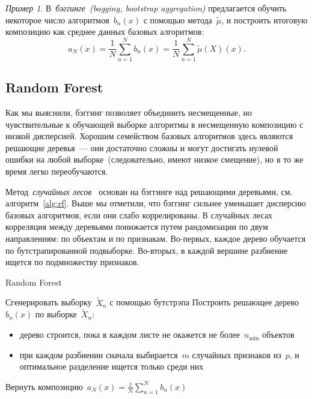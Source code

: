 \documentclass[a4paper, 12pt]{article}
\theoremstyle{plain} %
\theoremstyle{definition} %
\theoremstyle{remark} %
\newtheorem{example}{Пример}
\begin{document}
\begin{example}
В~\emph{бэггинге~(bagging, bootstrap aggregation)} предлагается обучить некоторое
число алгоритмов~$b_n(x)$ с помощью метода~$\tilde \mu$, и построить итоговую композицию
как среднее данных базовых алгоритмов:
\[
    a_N(x)
    =
    \frac{1}{N}
    \sum_{n = 1}^{N}
        b_n(x)
    =
    \frac{1}{N}
    \sum_{n = 1}^{N}
        \tilde \mu(X)(x).
\]

\subsection{Random Forest}

Как мы выяснили, бэггинг позволяет объединить несмещенные,
но чувствительные к обучающей выборке алгоритмы в несмещенную
композицию с низкой дисперсией.
Хорошим семейством базовых алгоритмов здесь являются решающие деревья~---
они достаточно сложны и могут достигать нулевой ошибки
на любой выборке~(следовательно, имеют низкое смещение),
но в то же время легко переобучаются.

Метод~\emph{случайных лесов}~\cite{breiman01randomforest} основан на бэггинге над решающими деревьями,
см. алгоритм~\ref{alg:rf}.
Выше мы отметили, что бэггинг сильнее уменьшает дисперсию
базовых алгоритмов, если они слабо коррелированы.
В случайных лесах корреляция между деревьями понижается путем рандомизации
по двум направлениям: по объектам и по признакам.
Во-первых, каждое дерево обучается по бутстрапированной подвыборке.
Во-вторых, в каждой вершине разбиение ищется по подмножеству признаков.

\begin{centering}
	\begin{algorithm}[t]
	\caption{Random Forest}
	\label{alg:rf}
	    \begin{algorithmic}[1]
	            \STATE Сгенерировать выборку~$\tilde X_n$ с помощью бутстрэпа
	            \STATE Построить решающее дерево~$b_n(x)$ по выборке~$\tilde X_n$:
	                \begin{itemize}
	                    \item дерево строится, пока в каждом листе не окажется не более~$n_{\min}$ объектов
	                    \item при каждом разбиении сначала выбирается~$m$ случайных
	                        признаков из~$p$, и оптимальное разделение ищется только среди них
	                \end{itemize}
	        \ENDFOR
	        \STATE Вернуть композицию~$a_N(x) = \frac{1}{N} \sum_{n = 1}^{N} b_n(x)$
	    \end{algorithmic}
	\end{algorithm}
\end{centering}



\end{example}
\end{document}
